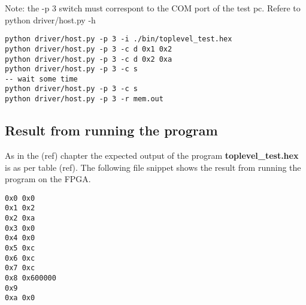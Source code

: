 Note: the -p 3 switch must correspont to the COM port of the test pc. Refere to python driver/host.py -h

\begin{verbatim}
python driver/host.py -p 3 -i ./bin/toplevel_test.hex
python driver/host.py -p 3 -c d 0x1 0x2
python driver/host.py -p 3 -c d 0x2 0xa
python driver/host.py -p 3 -c s
-- wait some time
python driver/host.py -p 3 -c s
python driver/host.py -p 3 -r mem.out
\end{verbatim}

\subsection{Result from running the program}
As in the (ref) chapter the expected output of the program {\bf toplevel\_test.hex} is as per table (ref).
The following file snippet shows the result from running the program on the FPGA.


\begin{verbatim}
0x0 0x0
0x1 0x2
0x2 0xa
0x3 0x0
0x4 0x0
0x5 0xc
0x6 0xc
0x7 0xc
0x8 0x600000
0x9
0xa	0x0
\end{verbatim}
